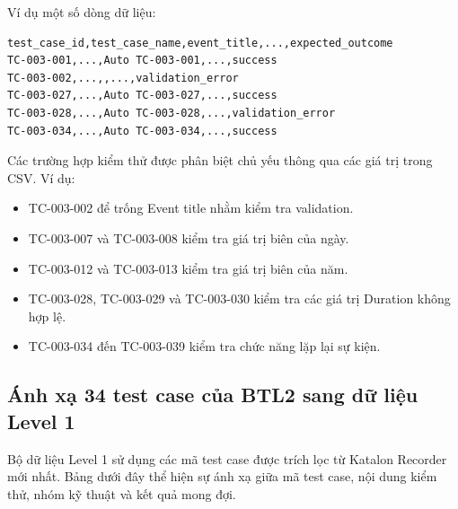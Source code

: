 \documentclass[12pt,a4paper]{article}
\begin{document}
Ví dụ một số dòng dữ liệu:

\begin{lstlisting}
test_case_id,test_case_name,event_title,...,expected_outcome
TC-003-001,...,Auto TC-003-001,...,success
TC-003-002,...,,...,validation_error
TC-003-027,...,Auto TC-003-027,...,success
TC-003-028,...,Auto TC-003-028,...,validation_error
TC-003-034,...,Auto TC-003-034,...,success
\end{lstlisting}

Các trường hợp kiểm thử được phân biệt chủ yếu thông qua các giá trị trong CSV. Ví dụ:

\begin{itemize}[noitemsep]
    \item TC-003-002 để trống Event title nhằm kiểm tra validation.
    \item TC-003-007 và TC-003-008 kiểm tra giá trị biên của ngày.
    \item TC-003-012 và TC-003-013 kiểm tra giá trị biên của năm.
    \item TC-003-028, TC-003-029 và TC-003-030 kiểm tra các giá trị Duration không hợp lệ.
    \item TC-003-034 đến TC-003-039 kiểm tra chức năng lặp lại sự kiện.
\end{itemize}

\subsection{Ánh xạ 34 test case của BTL2 sang dữ liệu Level 1}

Bộ dữ liệu Level 1 sử dụng các mã test case được trích lọc từ Katalon Recorder mới nhất. Bảng dưới đây thể hiện sự ánh xạ giữa mã test case, nội dung kiểm thử, nhóm kỹ thuật và kết quả mong đợi.
\end{document}
